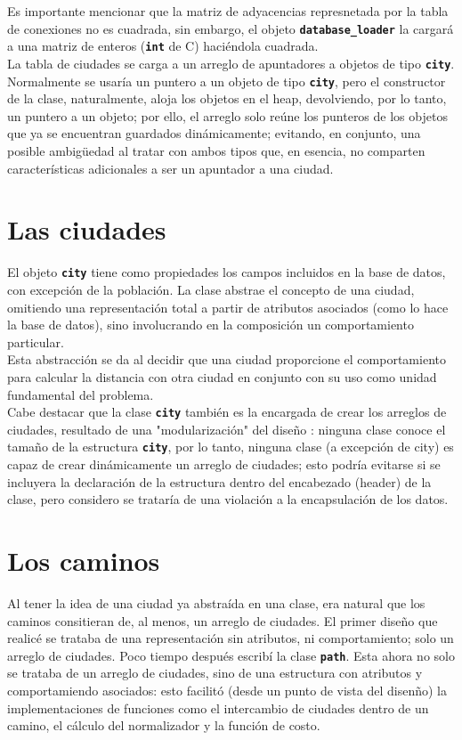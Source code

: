\documentclass[a4paper]{report}
\begin{document}
Es importante mencionar que la matriz de adyacencias represnetada por la tabla de
conexiones no es cuadrada, sin embargo, el objeto \textbf{\texttt{database\_loader}}
la cargar\'a  a una matriz de enteros (\textbf{\texttt{int}} de C) haci\'endola cuadrada.\\

La tabla de ciudades se carga a un arreglo de apuntadores a objetos de tipo
\textbf{\texttt{city}}. Normalmente se usar\'ia un puntero a un objeto de tipo
\textbf{\texttt{city}}, pero el constructor de la clase, naturalmente, aloja los
objetos en el heap, devolviendo, por lo tanto, un puntero a un objeto;
por ello, el arreglo solo re\'une los punteros de los objetos que
ya se encuentran guardados din\'amicamente; evitando, en conjunto,
una posible ambig\"uedad al tratar con ambos tipos que, en esencia, no
comparten caracter\'isticas adicionales a ser un apuntador a una ciudad.

\section{Las ciudades}
El objeto \textbf{\texttt{city}} tiene como propiedades los campos incluidos en la base de 
datos, con excepci\'on de la poblaci\'on. La clase abstrae el concepto de una
ciudad, omitiendo una representaci\'on total a partir de atributos asociados
(como lo hace la base de datos), sino involucrando en la composici\'on un
comportamiento particular.\\

Esta abstracci\'on se da al decidir que una ciudad proporcione el comportamiento
para calcular la distancia con otra ciudad en conjunto con su uso como unidad
fundamental del problema.\\

Cabe destacar que la clase \textbf{\texttt{city}} tambi\'en es la encargada de crear los
arreglos de ciudades, resultado de una "modularizaci\'on" del dise\~no : ninguna clase
conoce el tama\~no de la estructura \textbf{\texttt{city}}, por lo tanto, ninguna clase (a
excepci\'on de city) es capaz de crear din\'amicamente un arreglo de ciudades; esto
podr\'ia evitarse si se incluyera la declaraci\'on de la estructura dentro del encabezado
(header) de la clase, pero considero se tratar\'ia de una violaci\'on a la encapsulaci\'on
de los datos.

\section{Los caminos}
Al tener la idea de una ciudad ya abstra\'ida en una clase, era natural que los caminos consitieran
de, al menos, un arreglo de ciudades. El primer dise\~no que realic\'e se trataba de una representaci\'on
sin atributos, ni comportamiento; solo un arreglo de ciudades. Poco tiempo despu\'es escrib\'i la
clase \textbf{\texttt{path}}. Esta ahora no solo se trataba de un arreglo de ciudades, sino de
una estructura con atributos y comportamiendo asociados: esto facilit\'o (desde un punto de vista
del disen\~no) la implementaciones de funciones como el intercambio de ciudades dentro de un camino,
el c\'alculo del normalizador y la funci\'on de costo.\\
\end{document}
